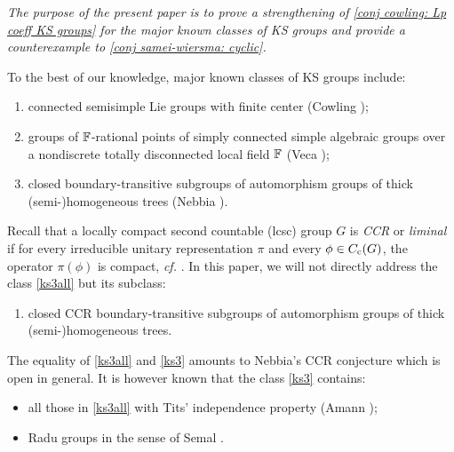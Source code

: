 \documentclass[a4paper, 10pt]{article}
\begin{document}
    \begin{center}
        \emph{The purpose of the present paper is to prove a strengthening of \autoref{conj cowling: Lp coeff KS groups} for the major known classes of KS groups and provide a counterexample to \autoref{conj samei-wiersma: cyclic}.}
    \end{center}
    
    To the best of our knowledge, major known classes of KS groups include:
    \begin{enumerate}[label=(\roman*)]
        \item connected semisimple Lie groups with finite center (Cowling \cite{cowling1978the-kunze-stein});\label{ks1}
        \item groups of $\mathbb{F}$-rational points of simply connected simple algebraic groups over a nondiscrete totally disconnected local field $\mathbb{F}$ (Veca \cite{veca2002the-kunze-stein});\label{ks2}
        \item closed boundary-transitive subgroups of automorphism groups of thick (semi-)homogeneous trees (Nebbia \cite{nebbia1988groups}).\label{ks3all}
    \end{enumerate}
    Recall that a locally compact second countable (lcsc) group $G$ is \emph{CCR} or \emph{liminal} if for every irreducible unitary representation $\pi$ and every $\phi\in C_{\mathrm{c}}(G)$, the operator $\pi(\phi)$ is compact, \emph{cf.} \cite[Def 6.E.7]{bekka-harpe2020unitary}.
    In this paper, we will not directly address the class \ref{ks3all} but its subclass:
    \begin{enumerate}
        \makeatletter
        \item[(iii')] \def\@currentlabel{(iii')}\label{ks3} closed CCR boundary-transitive subgroups of automorphism groups of thick (semi-)homogeneous trees.
        \makeatother
    \end{enumerate}
    The equality of \ref{ks3all} and \ref{ks3} amounts to Nebbia's CCR conjecture \cite{nebbia1999groups} which is open in general. It is however known that the class \ref{ks3} contains:
    \begin{itemize}
        \item all those in \ref{ks3all} with Tits' independence property (Amann \cite{amann2003groups});
        \item Radu groups in the sense of Semal \cite{semal2024radu}.
    \end{itemize}
\end{document}
